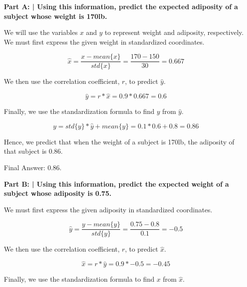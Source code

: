 \documentclass{article}
\begin{document}
 \textbf{Part A: | Using this information, predict the expected adiposity of a subject whose weight is 170lb.}\newline
 
 We will use the variables $x$ and $y$ to represent weight and adiposity, respectively. We must first express the given weight in standardized coordinates.\newline
 
 \begin{displaymath}
    \hat{x} = \frac{x - mean\{x\}}{std\{x\}} = \frac{170 - 150}{30} = 0.667
 \end{displaymath}
 
 We then use the correlation coefficient, $r$, to predict $\hat{y}$.
 
 \begin{displaymath}
    \hat{y} = r*\hat{x} = 0.9 * 0.667 = 0.6
 \end{displaymath}
 
 Finally, we use the standardization formula to find $y$ from $\hat{y}$.
 
 \begin{displaymath}
    y = std\{y\}*\hat{y} + mean\{y\} = 0.1 * 0.6 + 0.8 = 0.86
 \end{displaymath}
 
 Hence, we predict that when the weight of a subject is 170lb, the adiposity of that subject is 0.86.\newline
 
 Final Answer: 0.86.\newline
 
 \textbf{Part B: | Using this information, predict the expected weight of a subject whose adiposity is 0.75.}\newline
 
 We must first express the given adiposity in standardized coordinates.\newline
 
 \begin{displaymath}
    \hat{y} = \frac{y - mean\{y\}}{std\{y\}} = \frac{0.75 - 0.8}{0.1} = -0.5
 \end{displaymath}
 
 We then use the correlation coefficient, $r$, to predict $\hat{x}$.
 
 \begin{displaymath}
    \hat{x} = r*\hat{y} = 0.9 * -0.5 = -0.45
 \end{displaymath}
 
 Finally, we use the standardization formula to find $x$ from $\hat{x}$.
 
\end{document}
